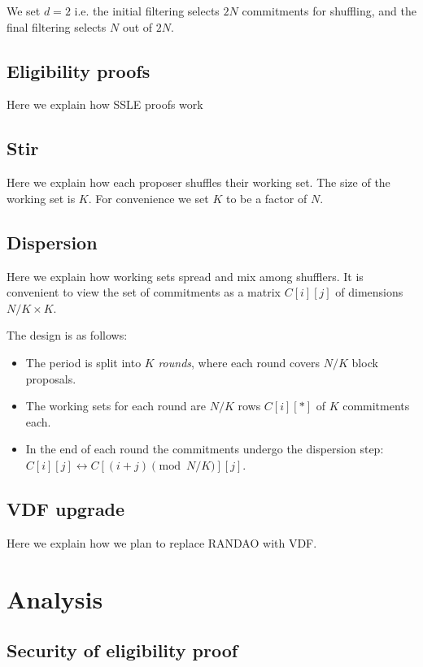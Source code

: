 \documentclass{article}
\begin{document}
We set $d=2$ i.e. the initial filtering selects $2N$ commitments for shuffling, and the final filtering selects $N$ out of $2N$.

\subsection{Eligibility proofs}

Here we explain how SSLE proofs work

\subsection{Stir}

Here we explain how each proposer shuffles their working set. The size of the working set is $K$. For convenience we set $K$ to be a factor of $N$.

\subsection{Dispersion}

Here we explain how working sets spread and mix among shufflers. It is convenient to view the set of commitments as a matrix $C[i][j]$ of dimensions $N/K \times K$.

The design is as follows:
\begin{itemize}
    \item The period is split into $K$ \emph{rounds}, where each round covers $N/K$ block proposals.
    \item The working sets for each round are $N/K$ rows $C[i][*]$ of $K$ commitments each.
    \item In the end of each round the commitments undergo the dispersion step: $C[i][j]\leftrightarrow C[(i+j) \pmod{N/K}][j]$.
\end{itemize}


\subsection{VDF upgrade}

Here we explain how we plan to replace RANDAO with VDF.

\section{Analysis}

\subsection{Security of eligibility proof}
\end{document}
